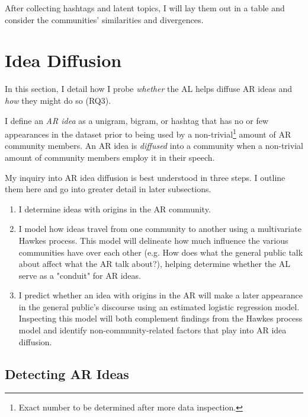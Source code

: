 \documentclass[acmlarge, screen, authorversion]{acmart}
\begin{document}
After collecting hashtags and latent topics, I will lay them out in a table and consider the communities' similarities and divergences.

\section{Idea Diffusion}

In this section, I detail how I probe \textit{whether} the AL helps diffuse AR ideas and \textit{how} they might do so (RQ3).

I define an \textit{AR idea} as a unigram, bigram, or hashtag that has no or few appearances in the dataset prior to being used by a non-trivial\footnote{Exact number to be determined after more data inspection.} amount of AR community members. An AR idea is \textit{diffused} into a community when a non-trivial amount of community members employ it in their speech.

My inquiry into AR idea diffusion is best understood in three steps. I outline them here and go into greater detail in later subsections.

\begin{enumerate}
	\item I determine ideas with origins in the AR community.
	\item I model how ideas travel from one community to another using a multivariate Hawkes process. This model will delineate how much influence the various communities have over each other (e.g. How does what the general public talk about affect what the AR talk about?), helping determine whether the AL serve as a "conduit" for AR ideas.
	\item I predict whether an idea with origins in the AR will make a later appearance in the general public's discourse using an estimated logistic regression model. Inspecting this model will both complement findings from the Hawkes process model and identify non-community-related factors that play into AR idea diffusion.
\end{enumerate}

\subsection{Detecting AR Ideas}

\end{document}
